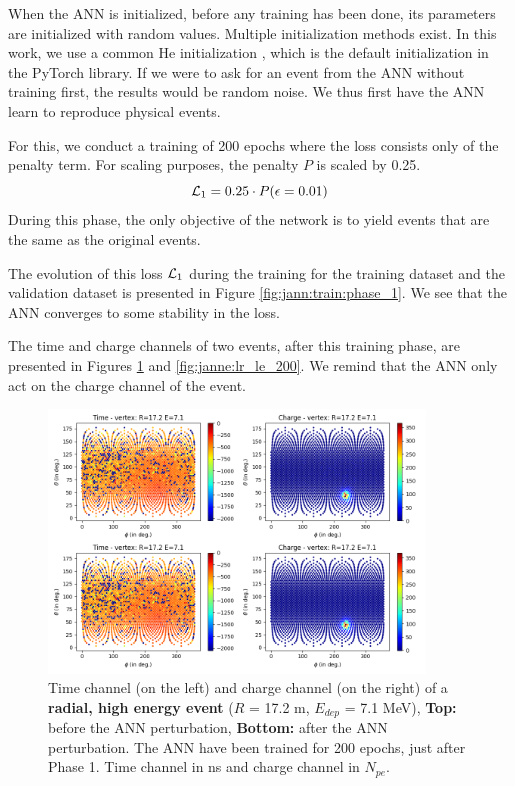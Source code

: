 \documentclass[../main.tex]{subfiles}
\begin{document}
When the ANN is initialized, before any training has been done, its parameters are initialized with random values. Multiple initialization methods exist. In this work, we use a common He initialization \cite{he_delving_2015}, which is the default initialization in the PyTorch \cite{ansel_pytorch_2024} library. If we were to ask for an event from the ANN without training first, the results would be random noise. We thus first have the ANN learn to reproduce physical events.

For this, we conduct a training of 200 epochs where the loss consists only of the penalty term. For scaling purposes, the penalty $P$ is scaled by 0.25.
\begin{equation}
  {\cal L}_1 = 0.25 \cdot P(\epsilon = 0.01)
\end{equation}
During this phase, the only objective of the network is to yield events that are the same as the original events.


The evolution of this loss ${\cal L}_1$ during the training for the training dataset and the validation dataset is presented in Figure \ref{fig:jann:train:phase_1}.
We see that the ANN converges to some stability in the loss.

The time and charge channels of two events, after this training phase, are presented in Figures \ref{fig:janne:hr_he_200} and \ref{fig:janne:lr_le_200}. We remind that the ANN only act on the charge channel of the event.
\begin{figure}[!ht]
  \centering
  \includegraphics[height=7cm]{images/janne/events/hr_he_200.png}
  \caption{Time channel (on the left) and charge channel (on the right) of a \textbf{radial, high energy event} ($R$ = 17.2 m, $E_{dep}$ = 7.1 MeV), \textbf{Top:} before the ANN perturbation, \textbf{Bottom:} after the ANN perturbation. The ANN have been trained for 200 epochs, just after Phase 1. Time channel in ns and charge channel in $N_{pe}$.}
  \label{fig:janne:hr_he_200}
\end{figure}
\end{document}
